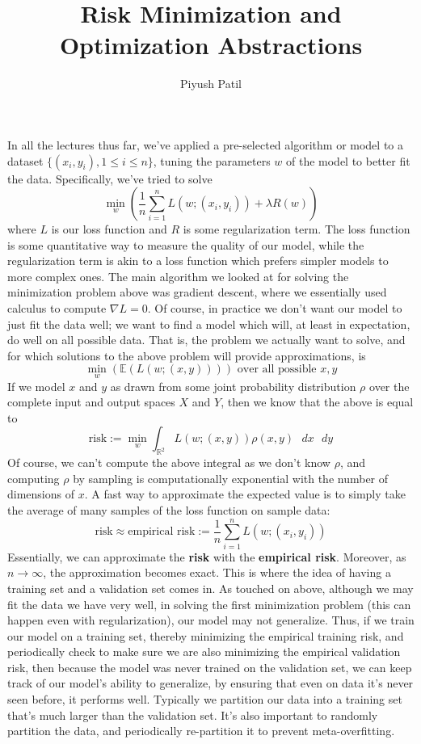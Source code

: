\documentclass{article}
\begin{document}
\title{Risk Minimization and Optimization Abstractions}
\author{Piyush Patil}
\maketitle

In all the lectures thus far, we've applied a pre-selected algorithm or model to a dataset $ \{ (x_i, y_i), 1 \leq i \leq n \} $, tuning the parameters $ w $ of the model to better fit the data. Specifically, we've tried to solve
$$ \min_w \left( \frac{1}{n} \sum_{i = 1}^n L(w ; (x_i, y_i)) + \lambda R(w) \right) $$
where $ L $ is our loss function and $ R $ is some regularization term.
\newline
The loss function is some quantitative way to measure the quality of our model, while the regularization term is akin to a loss function which prefers simpler models to more complex ones. The main algorithm we looked at for solving the minimization problem above was gradient descent, where we essentially used calculus to compute $ \nabla L = 0 $.
\newline
Of course, in practice we don't want our model to just fit the data well; we want to find a model which will, at least in expectation, do well on all possible data. That is, the problem we actually want to solve, and for which solutions to the above problem will provide approximations, is
$$ \min_w \left( \mathbb{E}(L(w ; (x, y))) \right) \text{ over all possible } x, y $$
If we model $ x $ and $ y $ as drawn from some joint probability distribution $ \rho $ over the complete input and output spaces $ X $ and $ Y $, then we know that the above is equal to
$$ \text{risk} := \min_w \int_{\mathbb{R}^2} L(w ; (x, y)) \rho(x, y) \text{ } dx \text{ } dy $$
Of course, we can't compute the above integral as we don't know $ \rho $, and computing $ \rho $ by sampling is computationally exponential with the number of dimensions of $ x $. A fast way to approximate the expected value is to simply take the average of many samples of the loss function on sample data:
$$ \text{risk} \approx \text{empirical risk} := \frac{1}{n} \sum_{i = 1}^n L(w ; (x_i, y_i)) $$
Essentially, we can approximate the \textbf{risk} with the \textbf{empirical risk}. Moreover, as $ n \rightarrow \infty $, the approximation becomes exact. This is where the idea of having a training set and a validation set comes in. As touched on above, although we may fit the data we have very well, in solving the first minimization problem (this can happen even with regularization), our model may not generalize. Thus, if we train our model on a training set, thereby minimizing the empirical training risk, and periodically check to make sure we are also minimizing the empirical validation risk, then because the model was never trained on the validation set, we can keep track of our model's ability to generalize, by ensuring that even on data it's never seen before, it performs well. Typically we partition our data into a training set that's much larger than the validation set. It's also important to randomly partition the data, and periodically re-partition it to prevent meta-overfitting.
\end{document}
